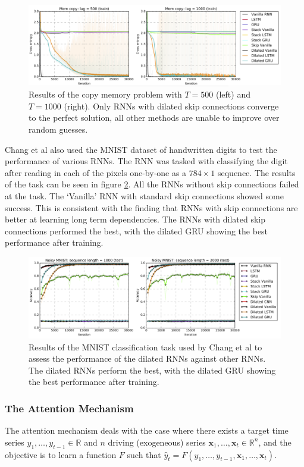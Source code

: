 \documentclass[a4paper,12pt]{article}
\theoremstyle{definition}
\begin{document}
\begin{figure}[ht]
	\centering
	\includegraphics[width=\textwidth]{figures/copy_memory_problem.png}
	\caption{Results of the copy memory problem with $T= 500$ (left) and $T = 1000$ (right). Only RNNs with dilated skip connections converge to the perfect solution, all other methods are unable to improve over random guesses. }
	\label{fig:copy_memory_problem}
\end{figure}

Chang et al also used the MNIST dataset of handwritten digits to test the performance of various RNNs. The RNN was tasked with classifying the digit after reading in each of the pixels one-by-one as a $784 \times 1$ sequence. The results of the task can be seen in figure \ref{fig:dilated_mnist}. All the RNNs without skip connections failed at the task. The `Vanilla' RNN with standard skip connections showed some success. This is consistent with the finding that RNNs with skip connections are better at learning long term dependencies. The RNNs with dilated skip connections performed the best, with the dilated GRU showing the best performance after training.

\begin{figure}[ht]
	\centering
	\includegraphics[width=\textwidth]{figures/dilated_mnist.png}
	\caption{Results of the MNIST classification task used by Chang et al to assess the performance of the dilated RNNs against other RNNs. The dilated RNNs perform the best, with the dilated GRU showing the best performance after training.}
	\label{fig:dilated_mnist}
\end{figure}

\subsubsection{The Attention Mechanism \cite{bahdanau}}
The attention mechanism deals with the case where there exists a target time series $y_1, \dots, y_{t-1} \in \mathbb{R}$ and $n$ driving (exogeneous) series $\mathbf{x}_1, \dots, \mathbf{x}_t \in \mathbb{R}^n$, and the objective is to learn a function $F$ such that $\hat{y}_t = F(y_1, \dots, y_{t-1}, \mathbf{x}_1, \dots, \mathbf{x}_t)$. 
\end{document}
